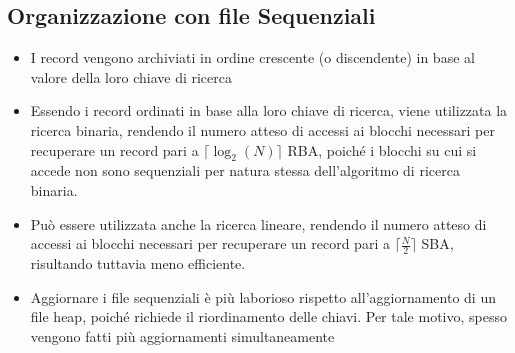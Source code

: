 \documentclass{article}
\begin{document}
\subsection{Organizzazione con file Sequenziali}
\begin{itemize}
  \item I record vengono archiviati in ordine crescente (o discendente) in base al valore della loro chiave di ricerca
  \item Essendo i record ordinati in base alla loro chiave di ricerca, viene utilizzata la ricerca binaria, rendendo il numero atteso di accessi ai blocchi necessari per recuperare un record pari a $\lceil \log_2(N) \rceil
  $ RBA, poiché i blocchi su cui si accede non sono sequenziali per natura stessa dell'algoritmo di ricerca binaria.
  \item Può essere utilizzata anche la ricerca lineare, rendendo il numero atteso di accessi ai blocchi necessari per recuperare un record pari a $\lceil \frac{N}{2} \rceil$ SBA, risultando tuttavia meno efficiente.
  \item Aggiornare i file sequenziali è più laborioso rispetto all'aggiornamento di un file heap, poiché richiede il riordinamento delle chiavi. Per tale motivo, spesso vengono fatti più aggiornamenti simultaneamente
\end{itemize}
\end{document}
